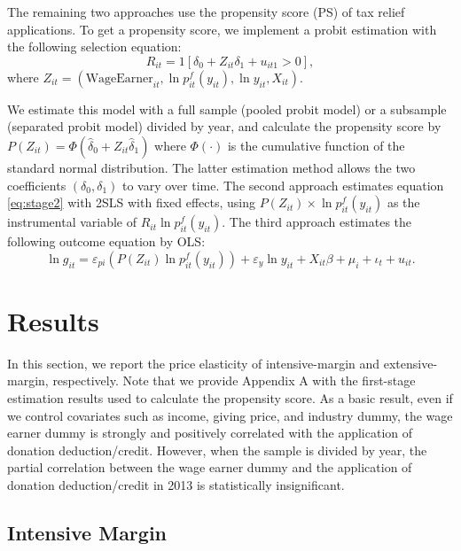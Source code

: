 \documentclass[
  11pt,
  a4paper,
]{article}
\begin{document}
The remaining two approaches use the propensity score (PS) of tax relief applications.
To get a propensity score,
we implement a probit estimation with the following selection equation:
\begin{equation}
  R_{it} = 1[\delta_0 + Z_{it} \delta_1 + u_{it1} > 0], \label{eq:stage1}
\end{equation}
where \(Z_{it} = (\text{WageEarner}_{it}, \ln p^f_{it}(y_{it}), \ln y_{it}, X_{it})\).

We estimate this model with a full sample (pooled probit model) or
a subsample (separated probit model) divided by year,
and calculate the propensity score by \(P(Z_{it}) = \Phi(\hat{\delta}_0 + Z_{it} \hat{\delta}_1)\)
where \(\Phi(\cdot)\) is the cumulative function of the standard normal distribution.
The latter estimation method allows the two coefficients \((\delta_0, \delta_1)\) to vary over time.
The second approach estimates equation \eqref{eq:stage2} with 2SLS with fixed effects,
using \(P(Z_{it}) \times \ln p^f_{it}(y_{it})\) as the instrumental variable of \(R_{it} \ln p^f_{it}(y_{it})\).
The third approach estimates the following outcome equation by OLS:
\begin{equation}
    \ln g_{it} = \varepsilon_{pi} (P(Z_{it}) \ln p^f_{it}(y_{it})) + \varepsilon_y \ln y_{it} 
    + X_{it}\beta +\mu_i +\iota_t +u_{it}. \label{eq:stage2red}
\end{equation}

\hypertarget{results}{%
\section{Results}\label{results}}

In this section, we report the price elasticity of intensive-margin and
extensive-margin, respectively.
Note that we provide Appendix A with the first-stage estimation results
used to calculate the propensity score.
As a basic result, even if we control covariates such as income,
giving price, and industry dummy,
the wage earner dummy is strongly and positively correlated with
the application of donation deduction/credit.
However, when the sample is divided by year,
the partial correlation between the wage earner dummy and
the application of donation deduction/credit in 2013 is
statistically insignificant.

\hypertarget{intensive-margin}{%
\subsection{Intensive Margin}\label{intensive-margin}}
\end{document}

